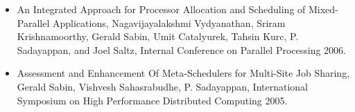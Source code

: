 \begin{itemize}
 	
 	
 	
 	
  	  \item An Integrated Approach for Processor Allocation and Scheduling
  	    of Mixed-Parallel Applications, Nagavijayalakshmi Vydyanathan,
  	    Sriram Krishnamoorthy, Gerald Sabin, Umit Catalyurek, Tahsin Kurc,
  	    P. Sadayappan, and Joel Saltz, Internal Conference on Parallel
  	    Processing 2006.
 	
 	
  	   \item Assessment and Enhancement Of Meta-Schedulers for Multi-Site
  	     Job Sharing, Gerald Sabin, Vishvesh Sahasrabudhe, P. Sadayappan,
  	     International Symposium on High Performance Distributed Computing
  	     2005.
 	
 	

\end{itemize}
